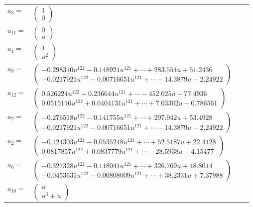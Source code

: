 \documentclass[1p]{elsarticle_modified}
\theoremstyle{definition}
\begin{document}
\begin{tabular}{m{7pt} m{180pt} m{7pt} m{180pt} }
\flushright $a_{3}=$&$\begin{pmatrix}1\\0\end{pmatrix}$ \\
\flushright $a_{11}=$&$\begin{pmatrix}0\\u\end{pmatrix}$ \\
\flushright $a_{4}=$&$\begin{pmatrix}1\\u^2\end{pmatrix}$ \\
\flushright $a_{8}=$&$\begin{pmatrix}-0.298310 u^{122}-0.148921 u^{121}+\cdots+283.554 u+51.2436\\-0.0217921 u^{122}-0.00716651 u^{121}+\cdots-14.3879 u-2.24922\end{pmatrix}$ \\
\flushright $a_{12}=$&$\begin{pmatrix}0.526224 u^{122}+0.236644 u^{121}+\cdots-452.025 u-77.4936\\0.0515116 u^{122}+0.0404131 u^{121}+\cdots+7.03362 u-0.786561\end{pmatrix}$ \\
\flushright $a_{7}=$&$\begin{pmatrix}-0.276518 u^{122}-0.141755 u^{121}+\cdots+297.942 u+53.4928\\-0.0217921 u^{122}-0.00716651 u^{121}+\cdots-14.3879 u-2.24922\end{pmatrix}$ \\
\flushright $a_{2}=$&$\begin{pmatrix}-0.124303 u^{122}-0.0535248 u^{121}+\cdots+52.5187 u+22.4128\\0.0817857 u^{122}+0.0837779 u^{121}+\cdots-28.5938 u-4.15477\end{pmatrix}$ \\
\flushright $a_{6}=$&$\begin{pmatrix}-0.327328 u^{122}-0.118041 u^{121}+\cdots+326.769 u+48.8014\\-0.0453631 u^{122}-0.00808009 u^{121}+\cdots+38.2331 u+7.37988\end{pmatrix}$ \\
\flushright $a_{10}=$&$\begin{pmatrix}u\\u^3+u\end{pmatrix}$ \\

\end{tabular}
\end{document}
